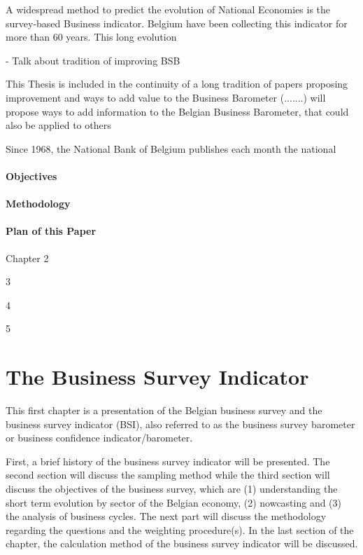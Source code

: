 \documentclass[12pt,a4paper,oneside]{book}
\begin{document}
A widespread method to predict the evolution of National Economies is the survey-based Business indicator. Belgium have been collecting this indicator for more than 60 years. This long evolution 

- Talk about tradition of improving BSB

This Thesis is included in the continuity of a long tradition of papers proposing improvement and ways to add value to the Business Barometer (.......) will propose ways to add information to the Belgian Business Barometer, that could also be applied to others

Since 1968, the National Bank of Belgium publishes each month the national 




\subsubsection{Objectives}

\subsubsection{Methodology}

\subsubsection{Plan of this Paper}

Chapter 2

3

4

5





\chapter{The Business Survey Indicator}

This first chapter is a presentation of the Belgian business survey and the business survey indicator (BSI), also referred to as the business survey barometer or business confidence indicator/barometer.

First, a brief history of the business survey indicator will be presented.
The second section will discuss the sampling method while the third section will discuss the objectives of the business survey, which are (1) understanding the short term evolution by sector of the Belgian economy, (2) nowcasting and (3) the analysis of business cycles.
The next part will discuss the methodology regarding the questions and the weighting procedure(s).
In the last section of the chapter, the calculation method of the business survey indicator will be discussed.
\end{document}

